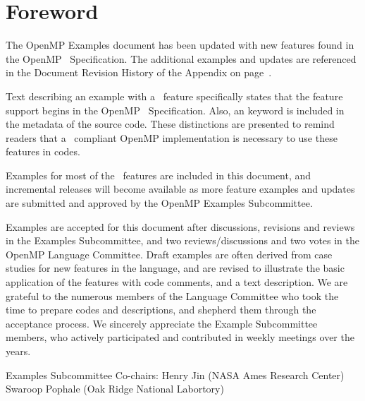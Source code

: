 \chapter*{Foreword}
\label{chap:foreword}

The OpenMP Examples document has been updated with new features
found in the OpenMP \PVER\ Specification. The additional examples and updates
are referenced in the Document Revision History of the Appendix on page~\pageref{chap:history}.

Text describing an example with a \PVER\ feature specifically states
that the feature support begins in the OpenMP \PVER\ Specification.  Also,
an  keyword is included in the  metadata of the source code.
These distinctions are presented to remind readers that a \PVER\ compliant 
OpenMP implementation is necessary to use these features in codes.

Examples for most of the \PVER\ features are included in this document,
and incremental releases will become available as more feature examples
and updates are submitted and approved by the OpenMP Examples Subcommittee.

Examples are accepted for this document after discussions, revisions and reviews
in the Examples Subcommittee, and two reviews/discussions and two votes
in the OpenMP Language Committee.
Draft examples are often derived from case studies for new features in the language,
and are revised to illustrate the basic application of the features with code comments,
and a text description. We are grateful to the numerous members of the Language Committee 
who took the time to prepare codes and descriptions, and shepherd them through
the acceptance process. We sincerely appreciate the Example Subcommittee members, who 
actively participated and contributed in weekly meetings over the years.

\bigskip
Examples Subcommittee Co-chairs: \smallskip\linebreak
Henry Jin (\textsc{NASA} Ames Research Center) \linebreak
Swaroop Pophale (Oak Ridge National Labortory)



